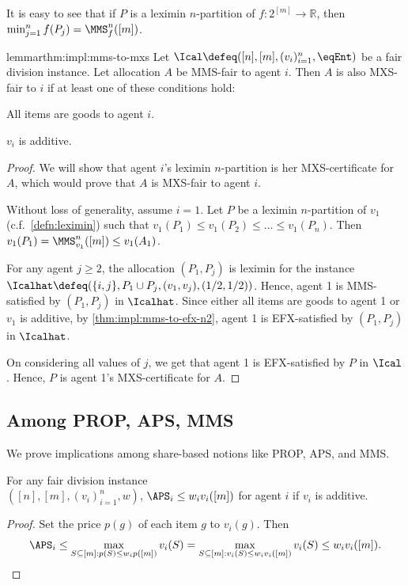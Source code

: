 It is easy to see that if $P$ is a leximin $n$-partition of $f: 2^{[m]} \to \mathbb{R}$,
then $\min_{j=1}^n f(P_j) = \MMS_f^n([m])$.

\begin{restatable}{lemma}{rthm:impl:mms-to-mxs}
\label{thm:impl:mms-to-mxs}
Let $\Ical \defeq ([n], [m], (v_i)_{i=1}^n, \eqEnt)$ be a fair division instance.
Let allocation $A$ be MMS-fair to agent $i$.
Then $A$ is also MXS-fair to $i$ if at least one of these conditions hold:
\begin{tightenum}
\item All items are goods to agent $i$.
\item $v_i$ is additive.
\end{tightenum}
\end{restatable}
\begin{proof}
We will show that agent $i$'s leximin $n$-partition is her MXS-certificate for $A$,
which would prove that $A$ is MXS-fair to agent $i$.

Without loss of generality, assume $i = 1$.
Let $P$ be a leximin $n$-partition of $v_1$ (c.f.~\cref{defn:leximin})
such that $v_1(P_1) \le v_1(P_2) \le \ldots \le v_1(P_n)$.
Then $v_1(P_1) = \MMS_{v_1}^n([m]) \le v_1(A_1)$.

For any agent $j \ge 2$, the allocation $(P_1, P_j)$ is leximin for
the instance $\Icalhat \defeq (\{i, j\}, P_1 \cup P_j, (v_1, v_j), (1/2, 1/2))$.
Hence, agent 1 is MMS-satisfied by $(P_1, P_j)$ in $\Icalhat$.
Since either all items are goods to agent 1 or $v_1$ is additive,
by \cref{thm:impl:mms-to-efx-n2}, agent 1 is EFX-satisfied by $(P_1, P_j)$ in $\Icalhat$.

On considering all values of $j$, we get that agent 1 is EFX-satisfied by $P$ in $\Ical$.
Hence, $P$ is agent 1's MXS-certificate for $A$.
\end{proof}

\subsection{Among PROP, APS, MMS}

We prove implications among share-based notions like PROP, APS, and MMS.

\begin{lemma}
\label{thm:impl:prop-to-aps}
For any fair division instance
\\ $([n], [m], (v_i)_{i=1}^n, w)$,
$\APS_i \le w_iv_i([m])$ for agent $i$ if $v_i$ is additive.
\end{lemma}
\begin{proof}
Set the price $p(g)$ of each item $g$ to $v_i(g)$. Then
\[ \APS_i \le \max_{S \subseteq [m]: p(S) \le w_ip([m])} v_i(S)
= \max_{S \subseteq [m]: v_i(S) \le w_iv_i([m])} v_i(S) \le w_iv_i([m]).
\qedhere \]
\end{proof}

